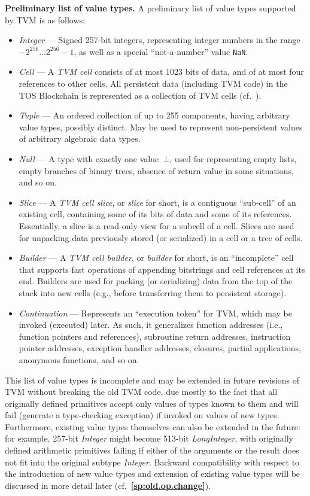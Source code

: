 \documentclass[12pt,oneside]{article}
\def\makepoint#1{\medbreak\noindent{\bf #1.\ }}
\def\nxsubpoint{\refstepcounter{subsubsection}%
  \smallbreak\makepoint{\thesubsubsection}}
\def\refpoint#1{{\rm\textbf{\ref{#1}}}}
\let\ptref=\refpoint
\def\emb#1{\textbf{#1.}}
\begin{document}
\nxsubpoint\label{sp:val.types}\emb{Preliminary list of value types}
A preliminary list of value types supported by TVM is as follows:
\begin{itemize}
\item {\em Integer\/} --- Signed 257-bit integers, representing integer numbers in the range $-2^{256}\ldots2^{256}-1$, as well as a special ``not-a-number'' value \texttt{NaN}.
\item {\em Cell\/} --- A {\em TVM cell\/} consists of at most 1023 bits of data, and of at most four references to other cells. All persistent data (including TVM code) in the TOS Blockchain is represented as a collection of TVM cells (cf.~\cite[2.5.14]{TOS}).
\item {\em Tuple\/} --- An ordered collection of up to 255 components, having arbitrary value types, possibly distinct. May be used to represent non-persistent values of arbitrary algebraic data types.
\item {\em Null\/} --- A type with exactly one value~$\bot$, used for representing empty lists, empty branches of binary trees, absence of return value in some situations, and so on.
\item {\em Slice\/} --- A {\em TVM cell slice}, or {\em slice\/} for short, is a contiguous ``sub-cell'' of an existing cell, containing some of its bits of data and some of its references. Essentially, a slice is a read-only view for a subcell of a cell. Slices are used for unpacking data previously stored (or serialized) in a cell or a tree of cells.
\item {\em Builder\/} --- A {\em TVM cell builder}, or {\em builder\/} for short, is an ``incomplete'' cell that supports fast operations of appending bitstrings and cell references at its end. Builders are used for packing (or serializing) data from the top of the stack into new cells (e.g., before transferring them to persistent storage).
\item {\em Continuation\/} --- Represents an ``execution token'' for TVM, which may be invoked (executed) later. As such, it generalizes function addresses (i.e., function pointers and references), subroutine return addresses, instruction pointer addresses, exception handler addresses, closures, partial applications, anonymous functions, and so on.
\end{itemize}
This list of value types is incomplete and may be extended in future revisions of TVM without breaking the old TVM code, due mostly to the fact that all originally defined primitives accept only values of types known to them and will fail (generate a type-checking exception) if invoked on values of new types. Furthermore, existing value types themselves can also be extended in the future: for example, 257-bit {\em Integer\/} might become 513-bit {\em LongInteger\/}, with originally defined arithmetic primitives failing if either of the arguments or the result does not fit into the original subtype {\em Integer}. Backward compatibility with respect to the introduction of new value types and extension of existing value types will be discussed in more detail later (cf.~\ptref{sp:old.op.change}).
\end{document}
